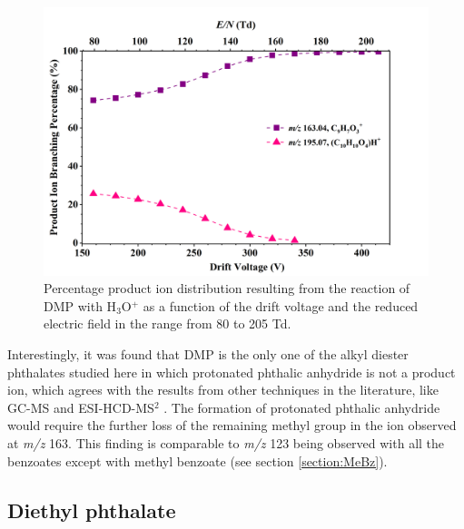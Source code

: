\begin{figure}[htb]%
\centering
\includegraphics[height=0.35\textheight]{pics/DMP-BR.png}
\caption{Percentage product ion distribution resulting from the reaction of DMP with H$_3$O$^+$ as a function of the drift voltage and the reduced electric field in the range from 80 to 205 Td.}
\label{fig:PH_DMP_fs}
\end{figure}

Interestingly, it was found that DMP is the only one of the alkyl diester phthalates studied here in which protonated phthalic anhydride is not a product ion, which agrees with the results from other techniques in the literature, like GC-MS and ESI-HCD-MS$^2$ \cite{yin2014mass,mzcloudDMP}.
%
The formation of protonated phthalic anhydride would require the further loss of the remaining methyl group in the ion observed at \textit{m/z} 163.
%
This finding is comparable to  \textit{m/z} 123 being observed with all the benzoates except with methyl benzoate (see section \ref{section:MeBz}). 
%








\subsection{Diethyl phthalate}


